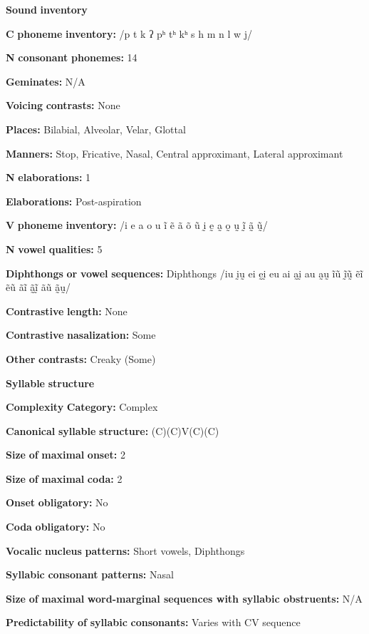 \begin{styleBody}
\textbf{Sound} \textbf{inventory}

\textbf{C} \textbf{phoneme} \textbf{inventory:} /p t k ʔ pʰ tʰ kʰ s h m n l w j/

\textbf{N} \textbf{consonant} \textbf{phonemes:} 14

\textbf{Geminates:} N/A

\textbf{Voicing} \textbf{contrasts:} None

\textbf{Places:} Bilabial, Alveolar, Velar, Glottal

\textbf{Manners:} Stop, Fricative, Nasal, Central approximant, Lateral approximant

\textbf{N} \textbf{elaborations:} 1

\textbf{Elaborations:} Post-aspiration

\textbf{V} \textbf{phoneme} \textbf{inventory:} /i e a o u ĩ ẽ ã õ ũ ḭ ḛ a̰ o̰ ṵ ḭ̃ ã̰ ṵ̃/

\textbf{N} \textbf{vowel} \textbf{qualities:} 5

\textbf{Diphthongs} \textbf{or} \textbf{vowel} \textbf{sequences:} Diphthongs /iu ḭṵ ei ḛḭ eu ai a̰ḭ au a̰ṵ ĩũ ḭ̃ṵ̃ ẽĩ ẽũ ãĩ ã̰ḭ̃ ãũ ã̰ṵ/

\textbf{Contrastive} \textbf{length:} None

\textbf{Contrastive} \textbf{nasalization:} Some

\textbf{Other} \textbf{contrasts:} Creaky (Some)

\textbf{Syllable} \textbf{structure}

\textbf{Complexity} \textbf{Category:} Complex

\textbf{Canonical} \textbf{syllable} \textbf{structure:} (C)(C)V(C)(C) \citep[124-34]{Eberhard2009}

\textbf{Size} \textbf{of} \textbf{maximal} \textbf{onset:} 2

\textbf{Size} \textbf{of} \textbf{maximal} \textbf{coda:} 2

\textbf{Onset} \textbf{obligatory:} No

\textbf{Coda} \textbf{obligatory:} No

\textbf{Vocalic} \textbf{nucleus} \textbf{patterns:} Short vowels, Diphthongs

\textbf{Syllabic} \textbf{consonant} \textbf{patterns:} Nasal

\textbf{Size} \textbf{of} \textbf{maximal} \textbf{word{}-marginal sequences with syllabic obstruents:} N/A

\textbf{Predictability} \textbf{of} \textbf{syllabic} \textbf{consonants:} Varies with CV sequence


\end{styleBody}
